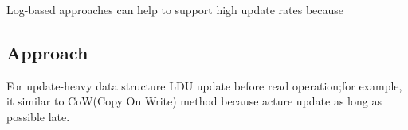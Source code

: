 %

Log-based approaches can help to support high update rates because


\subsection{Approach}




For update-heavy data structure LDU update before read operation;for example, it
similar to CoW(Copy On Write) method because acture update as long as possible
late.


